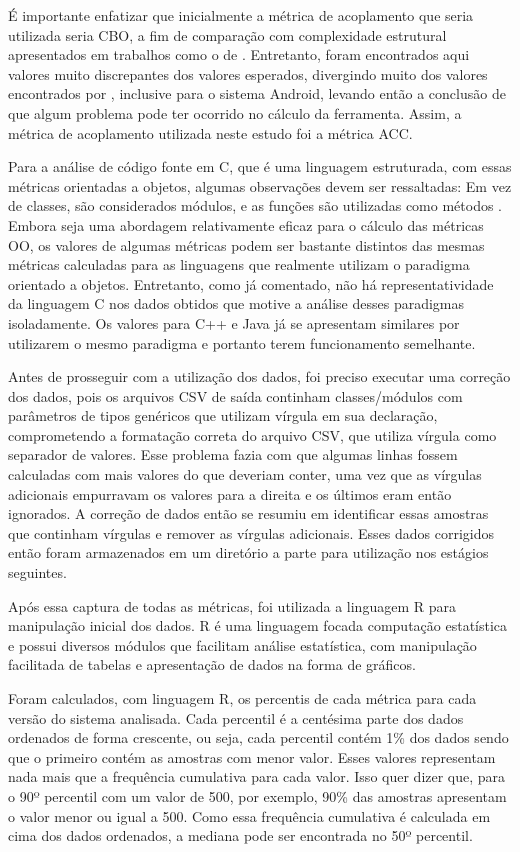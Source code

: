 É importante enfatizar que inicialmente a métrica de acoplamento que seria utilizada seria CBO, a fim de comparação com complexidade estrutural apresentados em trabalhos como o de . Entretanto, foram encontrados aqui valores muito discrepantes dos valores esperados, divergindo muito dos valores encontrados por , inclusive para o sistema Android, levando então a conclusão de que algum problema pode ter ocorrido no cálculo da ferramenta. Assim, a métrica de acoplamento utilizada neste estudo foi a métrica ACC.

Para a análise de código fonte em C, que é uma linguagem estruturada, com essas métricas orientadas a objetos, algumas observações devem ser ressaltadas: Em vez de classes, são considerados módulos, e as funções são utilizadas como métodos \cite{terceiro2009}. Embora seja uma abordagem relativamente eficaz para o cálculo das métricas OO, os valores de algumas métricas podem ser bastante distintos das mesmas métricas calculadas para as linguagens que realmente utilizam o paradigma orientado a objetos. Entretanto, como já comentado, não há representatividade da linguagem C nos dados obtidos que motive a análise desses paradigmas isoladamente. Os valores para C++ e Java já se apresentam similares por utilizarem o mesmo paradigma e portanto terem funcionamento semelhante.

Antes de prosseguir com a utilização dos dados, foi preciso executar uma correção dos dados, pois os arquivos CSV de saída continham classes/módulos com parâmetros de tipos genéricos que utilizam vírgula em sua declaração, comprometendo a formatação correta do arquivo CSV, que utiliza vírgula como separador de valores. Esse problema fazia com que algumas linhas fossem calculadas com mais valores do que deveriam conter, uma vez que as vírgulas adicionais empurravam os valores para a direita e os últimos eram então ignorados. A correção de dados então se resumiu em identificar essas amostras que continham vírgulas e remover as vírgulas adicionais. Esses dados corrigidos então foram armazenados em um diretório a parte para utilização nos estágios seguintes.

Após essa captura de todas as métricas, foi utilizada a linguagem R para manipulação inicial dos dados. R é uma linguagem focada computação estatística e possui diversos módulos que facilitam análise estatística, com manipulação facilitada de tabelas e apresentação de dados na forma de gráficos.

Foram calculados, com linguagem R, os percentis de cada métrica para cada versão do sistema analisada. Cada percentil é a centésima parte dos dados ordenados de forma crescente, ou seja, cada percentil contém 1\% dos dados sendo que o primeiro contém as amostras com menor valor. Esses valores representam nada mais que a frequência cumulativa para cada valor. Isso quer dizer que, para o 90º percentil com um valor de 500, por exemplo, 90\% das amostras apresentam o valor menor ou igual a 500. Como essa frequência cumulativa é calculada em cima dos dados ordenados, a mediana pode ser encontrada no 50º percentil.

